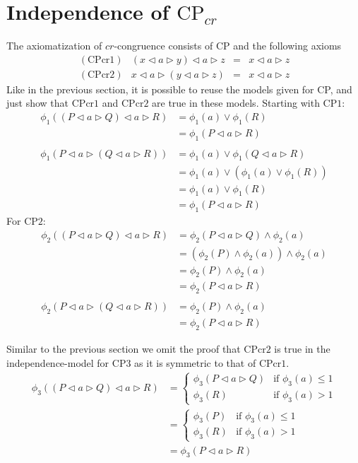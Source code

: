 \documentclass[a4paper,twoside,openright]{report}
\newcommand{\CP}[1]{\ensuremath{\mathrm{CP#1}}}
\newcommand{\CPcr}[1]{\ensuremath{\mathrm{CPcr#1}}}
\newcommand{\lef}{\ensuremath{\triangleleft}}
\newcommand{\rig}{\ensuremath{\triangleright}}
\begin{document}
\section{Independence of $\text{CP}_{cr}$}
The axiomatization of $cr$-congruence consists of CP and the following axioms
\[
\begin{array}{lrcl}
(\CPcr1) & (x\lef a\rig y)\lef a\rig z & = & x\lef a\rig z\\
(\CPcr2) & x\lef a\rig (y\lef a\rig z) & = & x\lef a\rig z
\end{array}
\]
Like in the previous section, it is possible to reuse the models given for CP, and just show that \CPcr1 and \CPcr2 are true in these models. Starting with \CP1:
\begin{align*}
\phi_1((P\lef a\rig Q)\lef a\rig R)
&=\phi_1(a)\vee\phi_1(R)\\
&=\phi_1(P\lef a\rig R)\\\\
\phi_1(P\lef a\rig(Q\lef a\rig R))
&=\phi_1(a)\vee\phi_1(Q\lef a\rig R)\\
&=\phi_1(a)\vee(\phi_1(a)\vee\phi_1(R))\\
&=\phi_1(a)\vee\phi_1(R)\\
&=\phi_1(P\lef a\rig R)
\end{align*}
For \CP2:
\begin{align*}
\phi_2((P\lef a\rig Q)\lef a\rig R)
&=\phi_2(P\lef a\rig Q)\wedge\phi_2(a)\\
&=(\phi_2(P)\wedge\phi_2(a))\wedge\phi_2(a)\\
&=\phi_2(P)\wedge\phi_2(a)\\
&=\phi_2(P\lef a\rig R)\\\\
\phi_2(P\lef a\rig(Q\lef a\rig R))
&=\phi_2(P)\wedge\phi_2(a)\\
&=\phi_2(P\lef a\rig R)
\end{align*}

Similar to the previous section we omit the proof that \CPcr2 is true in the independence-model for \CP3 as it is symmetric to that of \CPcr1.
\begin{align*}
\phi_3((P\lef a\rig Q)\lef a\rig R)
&=\begin{cases}
\phi_3(P\lef a\rig Q) & \text{if $\phi_3(a)\le 1$}\\
\phi_3(R) & \text{if $\phi_3(a)>1$}
\end{cases}\\
&=\begin{cases}
\phi_3(P) & \text{if $\phi_3(a)\le 1$}\\
\phi_3(R) & \text{if $\phi_3(a)>1$}
\end{cases}\\
&=\phi_3(P\lef a\rig R)
\end{align*}
\end{document}
